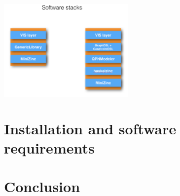 \documentclass[]{article}
\begin{document}
\includegraphics[width=0.5\textwidth]{fig/SoftwareStacks.jpg}
%
%
%

\section{Installation and software requirements}
\label{install-and-reqs}






\section{Conclusion}
\end{document}
